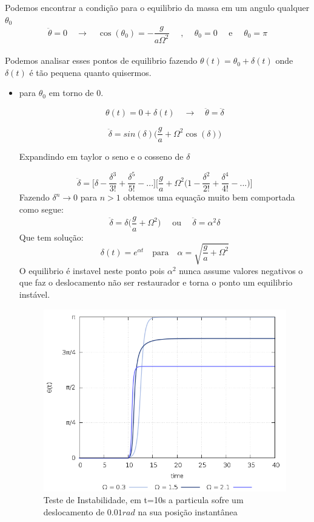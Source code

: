\documentclass[a4paper,11pt]{exam}
\begin{document}
	Podemos encontrar a condição para o equilibrio da massa em um angulo qualquer $\theta_0$
	\[ \ddot\theta  = 0 \quad \to \quad \cos(\theta_0) = -\frac{g}{a\Omega^2} \quad \text{ , } \quad \theta_0 = 0 \quad \text{ e } \quad \theta_0 = \pi\]
	\\
	Podemos analisar esses pontos de equilibrio fazendo $\theta(t) = \theta_0 + \delta(t)$ onde $\delta(t)$ é tão pequena quanto quisermos.
	\\
	\begin{itemize}
		
		\item{para $\theta_0$ em torno de $0$.}
		
		\[ \theta(t) = 0 + \delta(t) \quad \to \quad \ddot\theta = \ddot\delta \]
		
		\[ \ddot\delta = sin(\delta)\Big( \frac{g}{a}  +\Omega^2 \cos(\delta) \Big) \]
		
		Expandindo em taylor o seno e o cosseno de $\delta$ 	
		
		\[ \ddot\delta=\Big[\delta-\frac{\delta^3}{3!}+\frac{\delta^5}{5!}-...\Big]\Big[\frac{g}{a}+\Omega^2\big(1-\frac{\delta^2}{2!}+\frac{\delta^4}{4!}-...\big)\Big]\]
		Fazendo $\delta^n \to 0$ para $n>1$ obtemos uma equação muito bem comportada como segue:
		\[ \ddot\delta = \delta \Big( \frac{g}{a}  +\Omega^2 \Big) \quad \text{ ou } \quad \ddot\delta = \alpha^2 \delta\]
		Que tem solução:
		\[ \delta(t) = e^{\alpha t} \quad \text{para} \quad \alpha = \sqrt{\frac{g}{a}  +\Omega^2 }\]
	O equilibrio é instavel neste ponto pois $\alpha^2$ nunca assume valores negativos o que faz o deslocamento não ser restaurador e torna o ponto um equilibrio instável.
		\begin{figure}[h]
			\centering
			\includegraphics[scale=0.5]{Gr2.png}
			\caption{Teste de Instabilidade, em t=10s a particula sofre um deslocamento de $0.01rad$ na sua posição instantânea}
		\end{figure}
		

\end{itemize}
\end{document}
